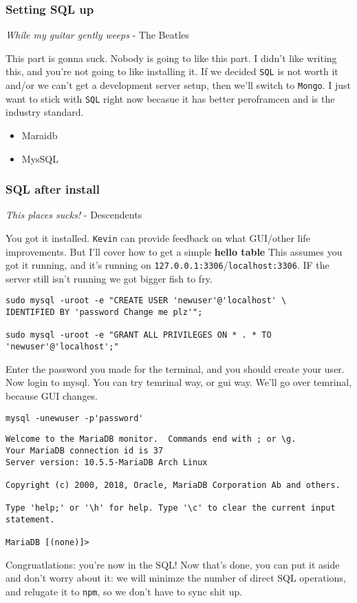 \documentclass[11pt]{article}
\begin{document}
\subsubsection*{Setting SQL up}
\label{sec:org0c45744}
\begin{center}
\emph{While my guitar gently weeps} - The Beatles
\end{center}
This part is gonna suck. Nobody is going to like this part. I didn't like writing this, and you're not going to like installing it. If we decided \texttt{SQL} is not worth it and/or we can't get a development server setup, then we'll switch to \texttt{Mongo}. I just want to stick with \texttt{SQL} right now becasue it has better peroframcen and is the industry standard.


\begin{itemize}
\item Maraidb
\item MysSQL
\end{itemize}

\subsubsection*{SQL after install}
\label{sec:org336c8f6}
\begin{center}
\emph{This places sucks!} - Descendents
\end{center}
You got it installed. \texttt{Kevin} can provide feedback on what GUI/other life improvements. But I'll cover how to get a simple \textbf{hello table}
This assumes you got it running, and it's running on \texttt{127.0.0.1:3306}​/​\texttt{localhost:3306}. IF the server still isn't running we got bigger fish to fry.

\begin{verbatim}
sudo mysql -uroot -e "CREATE USER 'newuser'@'localhost' \
IDENTIFIED BY 'password Change me plz'";

sudo mysql -uroot -e "GRANT ALL PRIVILEGES ON * . * TO 'newuser'@'localhost';"

\end{verbatim}
Enter the password you made for the terminal, and you should create your user. Now login to mysql. You can try temrinal way, or gui way. We'll go over temrinal, because GUI changes.

\begin{verbatim}
mysql -unewuser -p'password'
\end{verbatim}

\begin{verbatim}
Welcome to the MariaDB monitor.  Commands end with ; or \g.
Your MariaDB connection id is 37
Server version: 10.5.5-MariaDB Arch Linux

Copyright (c) 2000, 2018, Oracle, MariaDB Corporation Ab and others.

Type 'help;' or '\h' for help. Type '\c' to clear the current input statement.

MariaDB [(none)]> 
\end{verbatim}
Congruatlations: you're now in the SQL! Now that's done, you can put it aside and don't worry about it: we will minimze the number of direct SQL operations, and relugate it to \texttt{npm}, so we don't have to sync shit up.
\end{document}

